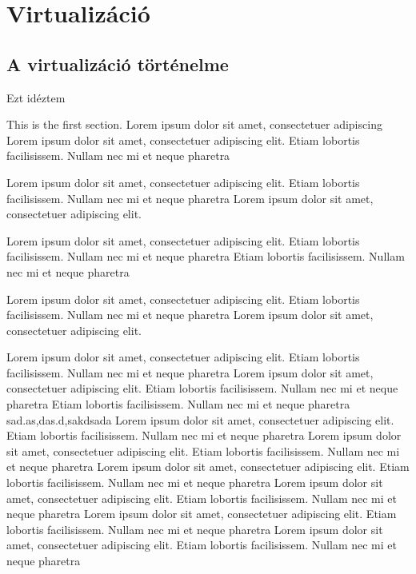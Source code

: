 \documentclass[12pt,oneside,justify]{book}
\begin{document}
 




\tableofcontents

\chapter{Virtualizáció}
\section{A virtualizáció történelme}
\noindent %

Ezt idéztem \cite{AzureFundamentals}

This is the first section.
Lorem  ipsum  dolor  sit  amet,  consectetuer  adipiscing  
Lorem ipsum dolor sit amet, consectetuer adipiscing elit.  
Etiam lobortis facilisissem.  Nullam nec mi et neque pharetra  
 




Lorem ipsum dolor sit amet, consectetuer adipiscing elit.  
Etiam lobortis facilisissem.  Nullam nec mi et neque pharetra Lorem ipsum dolor sit amet, consectetuer adipiscing elit.  
 
Lorem ipsum dolor sit amet, consectetuer adipiscing elit.  
Etiam lobortis facilisissem.  Nullam nec mi et neque pharetra Etiam lobortis facilisissem.  Nullam nec mi et neque pharetra  
 
Lorem ipsum dolor sit amet, consectetuer adipiscing elit.  
Etiam lobortis facilisissem.  Nullam nec mi et neque pharetra Lorem ipsum dolor sit amet, consectetuer adipiscing elit.  
 
Lorem ipsum dolor sit amet, consectetuer adipiscing elit.  
Etiam lobortis facilisissem.  Nullam nec mi et neque pharetra  
Lorem ipsum dolor sit amet, consectetuer adipiscing elit.  
Etiam lobortis facilisissem.  Nullam nec mi et neque pharetra Etiam lobortis facilisissem.  Nullam nec mi et neque pharetra 
 sad.as,das.d,sakdsada
Lorem ipsum dolor sit amet, consectetuer adipiscing elit.  
Etiam lobortis facilisissem.  Nullam nec mi et neque pharetra  
Lorem ipsum dolor sit amet, consectetuer adipiscing elit.  
Etiam lobortis facilisissem.  Nullam nec mi et neque pharetra  
Lorem ipsum dolor sit amet, consectetuer adipiscing elit.  
Etiam lobortis facilisissem.  Nullam nec mi et neque pharetra  
Lorem ipsum dolor sit amet, consectetuer adipiscing elit.  
Etiam lobortis facilisissem.  Nullam nec mi et neque pharetra  
Lorem ipsum dolor sit amet, consectetuer adipiscing elit.  
Etiam lobortis facilisissem.  Nullam nec mi et neque pharetra   
Lorem ipsum dolor sit amet, consectetuer adipiscing elit.  
Etiam lobortis facilisissem.  Nullam nec mi et neque pharetra  
 
\end{document}
